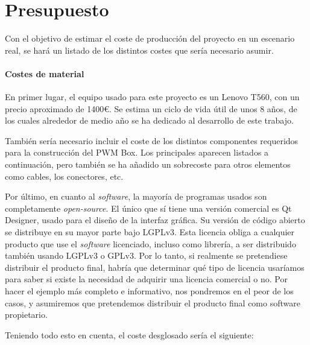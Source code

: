 \chapter{Presupuesto}

Con el objetivo de estimar el coste de producción del proyecto en un escenario real, se hará un listado de los distintos costes que sería necesario asumir.

\subsubsection{Costes de material}

En primer lugar, el equipo usado para este proyecto es un Lenovo T560, con un precio aproximado de 1400€. Se estima un ciclo de vida útil de unos 8 años, de los cuales alrededor de medio año se ha dedicado al desarrollo de este trabajo.

También sería necesario incluir el coste de los distintos componentes requeridos para la construcción del PWM Box. Los principales aparecen listados a continuación, pero también se ha añadido un sobrecoste para otros elementos como cables, los conectores, etc.

Por último, en cuanto al \textit{software}, la mayoría de programas usados son completamente \textit{open-source}. El único que sí tiene una versión comercial es Qt Designer, usado para el diseño de la interfaz gráfica. Su versión de código abierto se distribuye en su mayor parte bajo LGPLv3. Esta licencia obliga a cualquier producto que use el \textit{software} licenciado, incluso como librería, a ser distribuido también usando LGPLv3 o GPLv3. Por lo tanto, si realmente se pretendiese distribuir el producto final, habría que determinar qué tipo de licencia usaríamos para saber si existe la necesidad de adquirir una licencia comercial o no. Por hacer el ejemplo más completo e informativo, nos pondremos en el peor de los casos, y asumiremos que pretendemos distribuir el producto final como software propietario. \cite{qt-license} \cite{licenses}

Teniendo todo esto en cuenta, el coste desglosado sería el siguiente:

